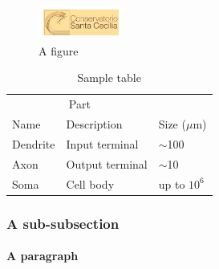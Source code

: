 \begin{figure}
    \centering
    \includegraphics[width=0.25\textwidth]{figures/unito-logo.png}
    \caption{A figure}
    \label{fig:figure}
\end{figure}

\lipsum[3-4]

\begin{table}
  \caption{Sample table}
  \label{sample-table}
  \centering
  \begin{tabular}{lll}
    \toprule
    \multicolumn{2}{c}{Part}                   \\
    \cmidrule(r){1-2}
    Name     & Description     & Size ($\mu$m) \\
    \midrule
    Dendrite & Input terminal  & $\sim$100     \\
    Axon     & Output terminal & $\sim$10      \\
    Soma     & Cell body       & up to $10^6$  \\
    \bottomrule
  \end{tabular}
\end{table}

\subsubsection{A sub-subsection}

\lipsum[5]

\paragraph{A paragraph} \lipsum[6]
